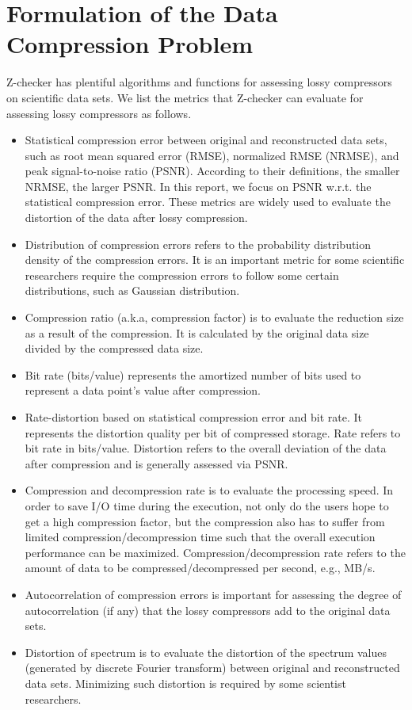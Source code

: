 \section{Formulation of the Data Compression Problem}
Z-checker has plentiful algorithms and functions for assessing lossy compressors on scientific data sets.
We list the metrics that Z-checker can evaluate for assessing lossy compressors as follows.
\begin{itemize}
\item Statistical compression error between original and reconstructed data sets, such as root mean squared error (RMSE), normalized RMSE (NRMSE), and peak signal-to-noise ratio (PSNR). According to their definitions, the smaller NRMSE, the larger PSNR. In this report, we focus on PSNR w.r.t. the statistical compression error.
These metrics are widely used to evaluate the distortion of the data after lossy compression.
\item Distribution of compression errors refers to the probability distribution density of the compression errors.
It is an important metric for some scientific researchers require the compression errors to follow some certain distributions, such as Gaussian distribution.
\item Compression ratio (a.k.a, compression factor) is to evaluate the reduction size as a result of the compression. It is calculated by the original data size divided by the compressed data size.
\item Bit rate (bits/value) represents the amortized number of bits used to represent a data point's value after compression.
\item Rate-distortion based on statistical compression error and bit rate. It represents the distortion quality per bit of compressed storage. 
Rate refers to bit rate in bits/value. Distortion refers to the overall deviation of the data after compression and is generally assessed via PSNR.
\item Compression and decompression rate is to evaluate the processing speed.
In order to save I/O time during the execution, not only do the users hope to get a high compression factor, but the compression also has to suffer from limited compression/decompression time such that the overall execution performance can be maximized.
Compression/decompression rate refers to the amount of data to be compressed/decompressed per second, e.g., MB/s.
\item Autocorrelation of compression errors is important for assessing the degree of autocorrelation (if any) that the lossy compressors add to the original data sets.
\item Distortion of spectrum is to evaluate the distortion of the spectrum values (generated by discrete Fourier transform) between original and reconstructed data sets.
Minimizing such distortion is required by some scientist researchers.
\end{itemize}



